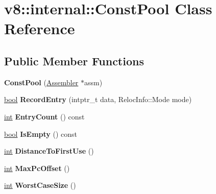 \hypertarget{classv8_1_1internal_1_1ConstPool}{}\section{v8\+:\+:internal\+:\+:Const\+Pool Class Reference}
\label{classv8_1_1internal_1_1ConstPool}
\subsection*{Public Member Functions}
\begin{DoxyCompactItemize}
\item 
\mbox{\label{classv8_1_1internal_1_1ConstPool_a10cd51c71aa865ccd6dec22f830bcfe5}} 
{\bfseries Const\+Pool} (\mbox{\hyperlink{classv8_1_1internal_1_1Assembler}{Assembler}} $\ast$assm)
\item 
\mbox{\label{classv8_1_1internal_1_1ConstPool_a37be23b9f30680f5e4c2e145e50bbe25}} 
\mbox{\hyperlink{classbool}{bool}} {\bfseries Record\+Entry} (intptr\+\_\+t data, Reloc\+Info\+::\+Mode mode)
\item 
\mbox{\label{classv8_1_1internal_1_1ConstPool_a164710973a00b3f8f3e0ad7926e63ae4}} 
\mbox{\hyperlink{classint}{int}} {\bfseries Entry\+Count} () const
\item 
\mbox{\label{classv8_1_1internal_1_1ConstPool_af083d890988d2b259c5576c43caa5e20}} 
\mbox{\hyperlink{classbool}{bool}} {\bfseries Is\+Empty} () const
\item 
\mbox{\label{classv8_1_1internal_1_1ConstPool_adf9bf9b440686da05462a7b9d734f57f}} 
\mbox{\hyperlink{classint}{int}} {\bfseries Distance\+To\+First\+Use} ()
\item 
\mbox{\label{classv8_1_1internal_1_1ConstPool_a194bc8abbe406d30b3c01834dfda7af8}} 
\mbox{\hyperlink{classint}{int}} {\bfseries Max\+Pc\+Offset} ()
\item 
\mbox{\label{classv8_1_1internal_1_1ConstPool_ade9c2b9a5ca36f8b2ff6b9df077187c8}} 
\mbox{\hyperlink{classint}{int}} {\bfseries Worst\+Case\+Size} ()

\end{DoxyCompactItemize}
